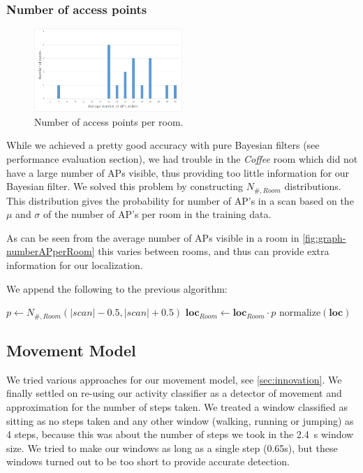 \documentclass[a4paper,10pt,twoside]{IEEEtran}
\begin{document}
\subsubsection{Number of access points}
\label{subsec:loc-numap}

\begin{figure}
  \centering
    \includegraphics[width=0.5\textwidth]{graph-numberAPperRoom}
    \caption{Number of access points per room.}
    \label{fig:graph-numberAPperRoom}
\end{figure}

While we achieved a pretty good accuracy with pure Bayesian filters (see performance evaluation section), we had trouble in the \emph{Coffee} room which did not have a large number of APs visible, thus providing too little information for our Bayesian filter.
We solved this problem by constructing $N_{\#,Room}$ distributions.
This distribution gives the probability for number of AP's in a scan based on the $\mu$ and $\sigma$ of the number of AP's per room in the training data.

As can be seen from the average number of APs visible in a room in \autoref{fig:graph-numberAPperRoom} this varies between rooms, and thus can provide extra information for our localization.

We append the following to the previous algorithm:
\\
\begin{algorithmic}
			\State $p \gets N_{\#,Room}(|scan|-0.5,|scan|+0.5)$
			\State $\mathbf{loc}_{Room} \gets \mathbf{loc}_{Room} \cdot p $
		\EndFor
		\State $\text{normalize}\left(\mathbf{loc}\right)$
	\EndIf
\end{algorithmic}

\subsection{Movement Model}
\label{sec:loc-movement-model}

We tried various approaches for our movement model, see \autoref{sec:innovation}.
We finally settled on re-using our activity classifier as a detector of movement and approximation for the number of steps taken. 
We treated a window classified as sitting as no steps taken and any other window (walking, running or jumping) as 4 steps, because this was about the number of steps we took in the 2.4~s window size.
We tried to make our windows as long as a single step (0.65s), but these windows turned out to be too short to provide accurate detection.
\end{document}
